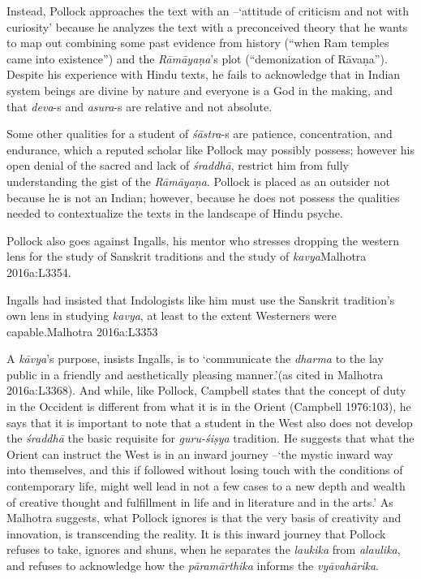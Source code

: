 Instead, Pollock approaches the text with an –‘attitude of criticism and not with curiosity’ because he analyzes the text with a preconceived theory that he wants to map out combining some past evidence from history (“when Ram temples came into existence”) and the \textit{Rāmāyaṇa}’s plot (“demonization of Rāvaṇa”). Despite his experience with Hindu texts, he fails to acknowledge that in Indian system beings are divine by nature and everyone is a God in the making, and that \textit{deva}-s and \textit{asura}-s are relative and not absolute.

Some other qualities for a student of \textit{śāstra}-s are patience, concentration, and endurance, which a reputed scholar like Pollock may possibly possess; however his open denial of the sacred and lack of \textit{śraddhā}, restrict him from fully understanding the gist of the \textit{Rāmāyaṇa}. Pollock is placed as an outsider not because he is not an Indian; however, because he does not possess the qualities needed to contextualize the texts in the landscape of Hindu psyche.

\begin{myquote}
Pollock also goes against Ingalls, his mentor who stresses dropping the western lens for the study of Sanskrit traditions and the study of \textit{kavya}\hfill Malhotra 2016a:L3354.
\end{myquote}

\newpage

Ingalls had insisted that Indologists like him must use the Sanskrit tradition’s own lens in studying \textit{kavya}, at least to the extent Westerners were capable.\hfill Malhotra 2016a:L3353

A \textit{kāvya}’s purpose, insists Ingalls, is to ‘communicate the \textit{dharma} to the lay public in a friendly and aesthetically pleasing manner.’(as cited in Malhotra 2016a:L3368). And while, like Pollock, Campbell states that the concept of duty in the Occident is different from what it is in the Orient (Campbell 1976:103), he says that it is important to note that a student in the West also does not develop the \textit{śraddhā} the basic requisite for \textit{guru-śiṣya} tradition. He suggests that what the Orient can instruct the West is in an inward journey –‘the mystic inward way into themselves, and this if followed without losing touch with the conditions of contemporary life, might well lead in not a few cases to a new depth and wealth of creative thought and fulfillment in life and in literature and in the arts.’ As Malhotra suggests, what Pollock ignores is that the very basis of creativity and innovation, is transcending the reality. It is this inward journey that Pollock refuses to take, ignores and shuns, when he separates the \textit{laukika} from \textit{alaulika}, and refuses to acknowledge how the \textit{pāramārthika} informs the \textit{vyāvahārika}.

